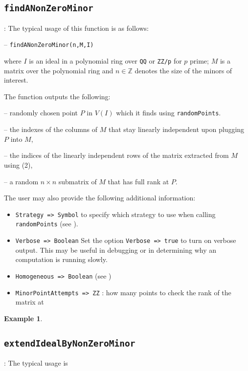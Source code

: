 \documentclass[11pt]{amsart}
\theoremstyle{definition}
\newtheorem{example}{Example}[section]
\begin{document}
	\subsection{\tt findANonZeroMinor}\label{findANonZeroMinor}: The typical usage of this function is as follows: 
	
	\vspace{1em}
	-- {\tt findANonZeroMinor(n,M,I)} 
	
	\vspace{1em}
	\noindent where $I$ is an ideal
	in a polynomial ring over {\tt QQ} or {\tt ZZ/p} for $p$ prime; $M$ is a matrix
	over the polynomial ring and $n\in \mathbb{Z}$ denotes the size of the minors of interest.
	
	The function outputs the following:
	
	-- randomly chosen point $P$ in $V(I)$ which it finds using {\tt randomPoints}.
	
	-- the indexes of the columns of $M$ that stay linearly independent upon plugging $P$ into $M$, 
	
	-- the indices of the linearly independent rows of the matrix extracted from $M$ using (2), 
	
	-- a random $n\times n$ submatrix of $M$ that has full rank at $P$.
	
The user may also provide the following additional information: 

\begin{itemize}
	\item {\tt Strategy => Symbol} to specify which strategy to use when calling {\tt randomPoints} (see ).
	
	\item {\tt Verbose => Boolean}
		 Set the option {\tt Verbose => true} to turn on verbose output.  This may be useful in debugging or in determining why an computation is running slowly.
		 
	\item {\tt Homogeneous => Boolean} (see )
	
	\item {\tt MinorPointAttempts => ZZ} :
	how many points to check the rank of the matrix at
\end{itemize}

\begin{example}
	
\end{example}

\subsection{\tt extendIdealByNonZeroMinor}\label{extendIdealByNonZeroMinor}: The typical usage is 
\end{document}
